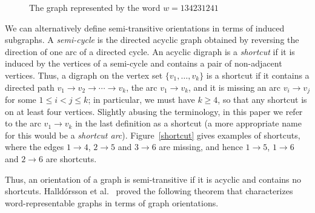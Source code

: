 \documentclass[12pt]{article}
\numberwithin{equation}{section}
\begin{document}
\begin{figure}[!htbp]
 \begin{center}
\caption{\label{wordandgraph} The graph represented by the word $w=134231241$}
\end{center}
\end{figure}

We can alternatively define semi-transitive orientations in terms of induced subgraphs. A \emph{semi-cycle} is the directed
acyclic graph obtained by reversing the direction of one arc of a directed cycle. An acyclic digraph is a
\emph{shortcut} if it is induced by the vertices of a semi-cycle and contains a pair of non-adjacent vertices. Thus, a
digraph on the vertex set $\{ v_1, \ldots, v_k\}$ is a shortcut if it contains a directed path $v_1\rightarrow
v_2\rightarrow \cdots \rightarrow v_k$, the arc $v_1\rightarrow v_k$, and it is missing an arc $v_i\rightarrow v_j$
for some $1 \le i < j \le k$; in particular, we must have $k\geq 4$, so that any shortcut is on at least four
vertices. Slightly abusing the terminology, in this paper we refer to the arc  $v_1\rightarrow v_k$ in the last definition as a shortcut (a more appropriate name for this would be a {\em shortcut arc}). Figure~\ref{shortcut} gives examples of shortcuts, where the edges $1\rightarrow 4$, $2\rightarrow 5$ and $3\rightarrow 6$ are missing, and hence $1\rightarrow 5$, $1\rightarrow 6$ and $2\rightarrow 6$ are shortcuts.

Thus, an orientation of a graph is semi-transitive if it is acyclic and contains no shortcuts. Halld\'{o}rsson et al.\ \cite{Halldorsson15} proved the following theorem that characterizes  word-representable graphs in terms of graph orientations.
\end{document}
